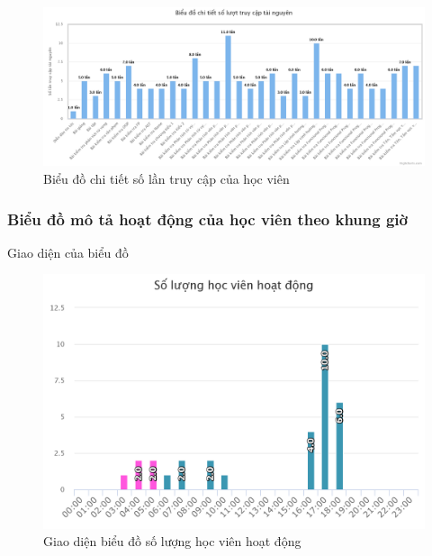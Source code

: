\begin{center}
	\begin{figure}[htp]
		\begin{center}
			\includegraphics[width=1\linewidth]{img/42}
		\end{center}
		\caption{Biểu đồ chi tiết số lần truy cập của học viên}
		\label{refhinh69}
	\end{figure}
\end{center}

\newpage
\subsubsection*{Biểu đồ mô tả hoạt động của học viên theo khung giờ}

Giao diện của biểu đồ

\begin{center}
	\begin{figure}[htp]
		\begin{center}
			\includegraphics[width=1\linewidth]{img/51}
		\end{center}
		\caption{Giao diện biểu đồ số lượng học viên hoạt động}
		\label{refhinh91}
	\end{figure}
\end{center}

